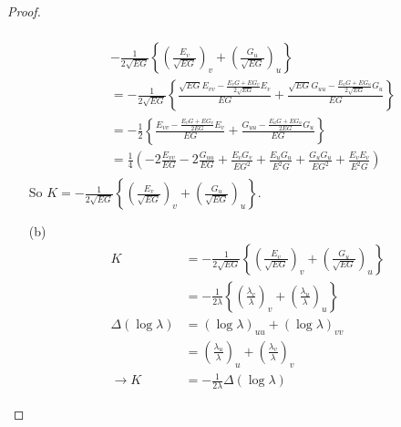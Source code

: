 \documentclass[10pt,a4paper]{article}
\begin{document}
\begin{proof}
\begin{enumerate}
\begin{align*}
\end{align*}
\begin{align*}
&-\frac{1}{2\sqrt{EG}}\left\{\left(\frac{E_v}{\sqrt{EG}}\right)_v+\left(\frac{G_u}{\sqrt{EG}}\right)_u\right\}\\
&=-\frac{1}{2\sqrt{EG}}\left\{\frac{\sqrt{EG}E_{vv}-\frac{E_vG+EG_v}{2\sqrt{EG}}E_v}{EG}+\frac{\sqrt{EG}G_{uu}-\frac{E_uG+EG_u}{2\sqrt{EG}}G_u}{EG}\right\}\\
&=-\frac{1}{2}\left\{\frac{E_{vv}-\frac{E_vG+EG_v}{2EG}E_v}{EG}+\frac{G_{uu}-\frac{E_uG+EG_u}{2EG}G_u}{EG}\right\}\\
&=\frac{1}{4}\left(-2\frac{E_{vv}}{EG}-2\frac{G_{uu}}{EG}+\frac{E_vG_v}{EG^2}+\frac{E_uG_u}{E^2G}+\frac{G_uG_u}{EG^2}+\frac{E_vE_v}{E^2G}\right)\\
\end{align*}
So $K=-\frac{1}{2\sqrt{EG}}\left\{\left(\frac{E_v}{\sqrt{EG}}\right)_v+\left(\frac{G_u}{\sqrt{EG}}\right)_u\right\}$.
\item[(b)]
\begin{align*}
K&=-\frac{1}{2\sqrt{EG}}\left\{\left(\frac{E_v}{\sqrt{EG}}\right)_v+\left(\frac{G_u}{\sqrt{EG}}\right)_u\right\}\\
&=-\frac{1}{2\lambda}\left\{\left(\frac{\lambda_v}{\lambda}\right)_v+\left(\frac{\lambda_u}{\lambda}\right)_u\right\}\\
\Delta(\log\lambda)&=(\log\lambda)_{uu}+(\log\lambda)_{vv}\\
&=\left(\frac{\lambda_u}{\lambda}\right)_u+\left(\frac{\lambda_v}{\lambda}\right)_v\\
\rightarrow K&=-\frac{1}{2\lambda}\Delta(\log\lambda)
\end{align*}
\end{enumerate}
\end{proof}
\end{document}
